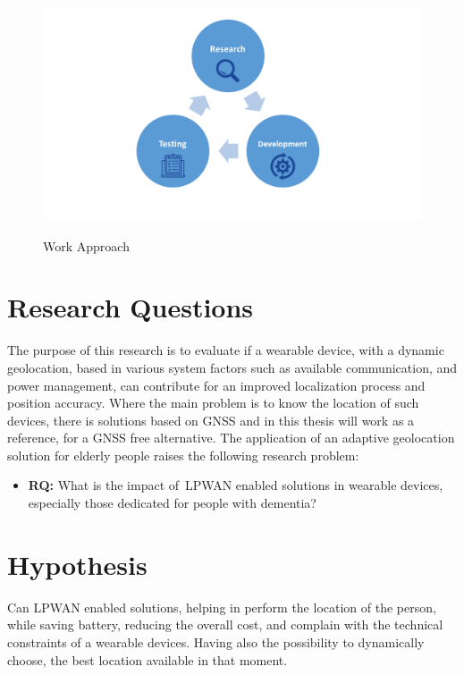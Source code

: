 \begin{figure}[htbp]
  \centering
    {\includegraphics[height=2.5in,width=1\linewidth]{Chapters/Figures/r&d.png}}%
  \caption{Work Approach}
  \label{fig:WorkApp}
\end{figure}

\newpage
\section{Research Questions} %
\label{sec:research_question}

The purpose of this research is to evaluate if a wearable device, with a dynamic geolocation,  based in various system factors such as available communication, and power management, can contribute for an improved localization process and position accuracy. Where the main problem is to know the location of such devices, there is solutions based on GNSS and in this thesis will work as a reference, for a GNSS free alternative. The application of an adaptive geolocation solution for elderly people raises the following research problem:

\begin{itemize}
	\item \textbf{RQ:} What is the impact of~\gls{LPWAN} enabled solutions in wearable devices, especially those dedicated for people with dementia?
\end{itemize} 

\section{Hypothesis}
\label{sec:hypothesis}

Can LPWAN enabled solutions, helping in perform the location of the person, while saving battery, reducing the overall cost, and complain with the technical constraints of a wearable devices. Having also the possibility to dynamically choose, the best location available in that moment.




